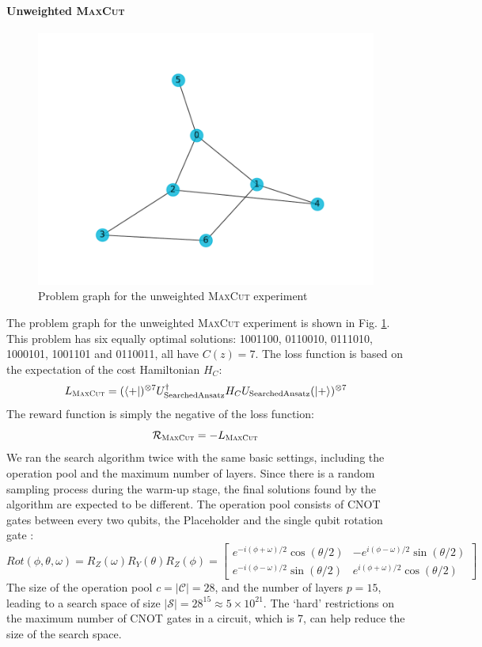 \documentclass[a4paper,onecolumn,11pt]{quantumarticle}
\begin{document}
\paragraph{Unweighted \textsc{MaxCut}}
\begin{figure}[H]
  \centering
  \includegraphics[width=0.8\linewidth]{Figures/fig_max_cut_large_7q.pdf}
  \caption{Problem graph for the unweighted \textsc{MaxCut} experiment}
  \label{fig:max_cut_prob}
\end{figure}
The problem graph for the unweighted \textsc{MaxCut} experiment is shown in Fig. \ref{fig:max_cut_prob}. This problem has six equally optimal solutions: 1001100, 0110010, 0111010, 1000101, 1001101 and 0110011, all have $C(z)=7$. The loss function is based on the expectation of the cost Hamiltonian $H_C$:
\begin{equation}
    L_{\textsc{MaxCut}} = (\bra{+})^{\otimes 7}U_{\rm SearchedAnsatz}^{\dagger} H_C U_{\rm SearchedAnsatz}   (\ket{+})^{\otimes 7}
\end{equation}
The reward function is simply the negative of the loss function:
\begin{equation}
    \mathcal{R}_{\textsc{MaxCut}} = -L_{\textsc{MaxCut}}
\end{equation}
We ran the search algorithm twice with the same basic settings, including the operation pool and the maximum number of layers. Since there is a random sampling process during the warm-up stage, the final solutions found by the algorithm are expected to be different. The operation pool consists of CNOT gates between every two qubits, the Placeholder and the single qubit rotation gate \cite{nielsen00}:
\begin{equation}
Rot(\phi, \theta, \omega)=R_Z(\omega) R_Y(\theta) R_Z(\phi)=\left[\begin{array}{cc}
e^{-i(\phi+\omega) / 2} \cos (\theta / 2) & -e^{i(\phi-\omega) / 2} \sin (\theta / 2) \\
e^{-i(\phi-\omega) / 2} \sin (\theta / 2) & e^{i(\phi+\omega) / 2} \cos (\theta / 2)
\end{array}\right]
\end{equation}
The size of the operation pool $c = \vert \mathcal{C} \vert = 28$, and the number of layers $p = 15$, leading to a search space of size $\vert \mathcal{S} \vert = 28^{15} \approx 5 \times10^{21}$. The `hard' restrictions on the maximum number of CNOT gates in a circuit, which is 7,  can help reduce the size of the search space.
\end{document}
